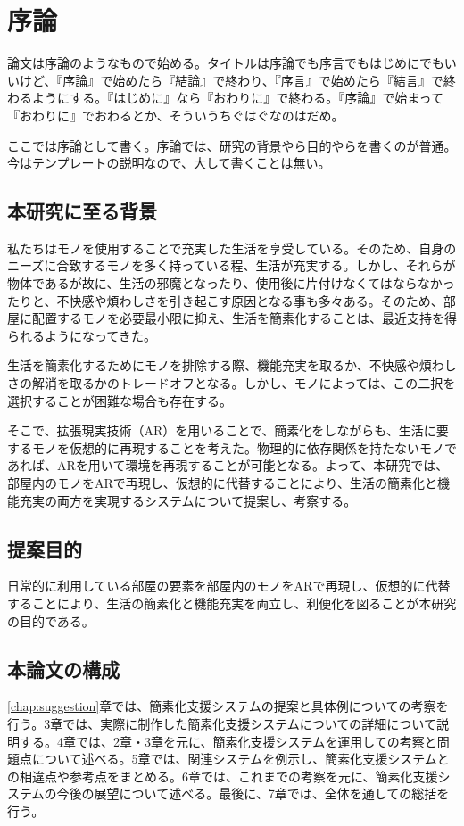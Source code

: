 \chapter{序論}
\label{chap:introduction}

論文は序論のようなもので始める。タイトルは序論でも序言でもはじめにでもいいけど、『序論』で始めたら『結論』で終わり、『序言』で始めたら『結言』で終わるようにする。『はじめに』なら『おわりに』で終わる。『序論』で始まって『おわりに』でおわるとか、そういうちぐはぐなのはだめ。

ここでは序論として書く。序論では、研究の背景やら目的やらを書くのが普通。今はテンプレートの説明なので、大して書くことは無い。

\newpage

\section{本研究に至る背景}

私たちはモノを使用することで充実した生活を享受している。そのため、自身のニーズに合致するモノを多く持っている程、生活が充実する。しかし、それらが物体であるが故に、生活の邪魔となったり、使用後に片付けなくてはならなかったりと、不快感や煩わしさを引き起こす原因となる事も多々ある。そのため、部屋に配置するモノを必要最小限に抑え、生活を簡素化することは、最近支持を得られるようになってきた。

生活を簡素化するためにモノを排除する際、機能充実を取るか、不快感や煩わしさの解消を取るかのトレードオフとなる。しかし、モノによっては、この二択を選択することが困難な場合も存在する。

そこで、拡張現実技術（AR）を用いることで、簡素化をしながらも、生活に要するモノを仮想的に再現することを考えた。物理的に依存関係を持たないモノであれば、ARを用いて環境を再現することが可能となる。よって、本研究では、部屋内のモノをARで再現し、仮想的に代替することにより、生活の簡素化と機能充実の両方を実現するシステムについて提案し、考察する。

\section{提案目的}

日常的に利用している部屋の要素を部屋内のモノをARで再現し、仮想的に代替することにより、生活の簡素化と機能充実を両立し、利便化を図ることが本研究の目的である。

\section{本論文の構成}

\ref{chap:suggestion}章では、簡素化支援システムの提案と具体例についての考察を行う。3章では、実際に制作した簡素化支援システムについての詳細について説明する。4章では、2章・3章を元に、簡素化支援システムを運用しての考察と問題点について述べる。5章では、関連システムを例示し、簡素化支援システムとの相違点や参考点をまとめる。6章では、これまでの考察を元に、簡素化支援システムの今後の展望について述べる。最後に、7章では、全体を通しての総括を行う。
